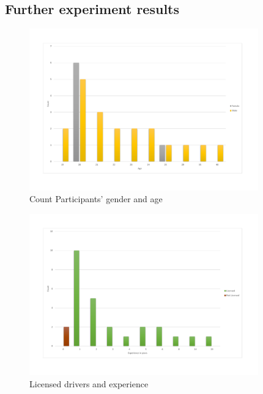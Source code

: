 \chapter{}

\section{Further experiment results}

\begin{figure}[!htb]
	\centering
	\includegraphics[height=7cm]{charts/genderAge.pdf}
	\caption[Age and gender of experiments particpants]{Count Participants' gender and age }
	\label{fig:chart-genderage}
\end{figure}

\begin{figure}[!htb]
	\centering
	\includegraphics[height=7cm]{charts/licenseddriversexperience.pdf}
	\caption[Particpants Licensed drivers and driving experience]{Licensed drivers and experience}
	\label{fig:chart-licenseddriversexperience}
\end{figure}

